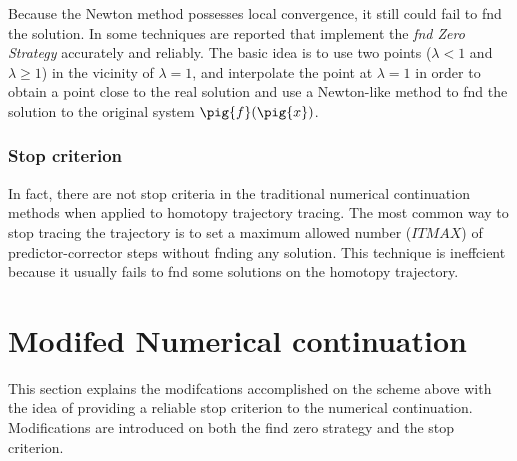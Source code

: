 \documentclass[conference]{IEEEtran}
\begin{document}
Because the Newton method possesses local convergence, it still could fail
to fnd the solution. In \cite{homo_sosonkina}
some techniques are reported
that implement the {\it fnd Zero Strategy} accurately and
reliably.  The basic idea is
to use two points ($\lambda < 1$ and $\lambda \geq 1$) in the vicinity of
$\lambda=1$, and interpolate the point at $\lambda=1$ in order to
obtain a point close to the real solution and use a Newton-like
method to fnd the solution to
the original system $\pig{f}(\pig{x})$.

\subsubsection{Stop criterion}

In fact, there are not stop criteria in the traditional numerical
continuation methods when applied to homotopy trajectory tracing.
The most common way to stop tracing the trajectory
 is to set a maximum allowed number ($ITMAX$)
of predictor-corrector steps without fnding
any solution. This technique is ineffcient because it usually 
fails
to fnd some solutions on the homotopy trajectory.

\section{Modifed Numerical continuation}

This section explains the modifcations accomplished on the
scheme above with the idea of providing a reliable stop criterion
to the numerical continuation. Modifications are introduced on both the
find zero strategy
and
the stop criterion.
\end{document}
